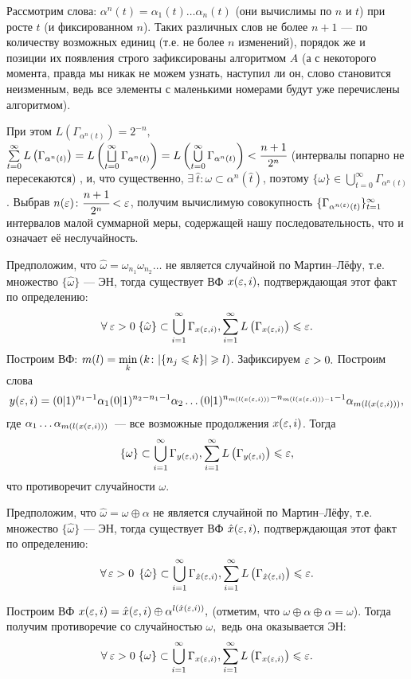 Рассмотрим слова: $\alpha^n(t)=\alpha_1(t)\ldots\alpha_n(t)$ (они вычислимы по $n$ и $t$) при росте $t$ (и фиксированном $n$). Таких различных слов не более $n+1$ --- по количеству возможных единиц (т.е. не более $n$ изменений), порядок же и позиции их появления строго зафиксированы алгоритмом $A$ (а с некоторого момента, правда мы никак не можем узнать, наступил ли он, слово становится неизменным, ведь все элементы с маленькими номерами будут уже перечислены алгоритмом). 

При этом
$L(\Gamma_{\alpha^n(t)})=2^{-n},$ 
$ \sum\limits_{t=0}^\infty L\left(\Gamma_{\alpha^n(t)}\right) =
L\left(\bigsqcup\limits_{t=0}^\infty\Gamma_{\alpha^n(t)}\right) = 
L\left(\bigcup\limits_{t=0}^\infty\Gamma_{\alpha^n(t)}\right) <
\cfrac{n+1}{2^n}$ (интервалы попарно не пересекаются)
, и, что существенно, $\exists \: \hat t \colon \omega\subset \alpha^n(\hat t)$, поэтому $\{\omega\} \in \bigcup\limits_{t=0}^\infty\Gamma_{\alpha^n(t)}$. Выбрав $n(\varepsilon)\colon \cfrac{n+1}{2^n} <  \varepsilon $, получим вычислимую совокупность $\{\Gamma_{\alpha^{n(\varepsilon)}(t)}\}_{t=1}^\infty$ интервалов малой суммарной меры, содержащей нашу последовательность, что и означает её неслучайность.


Предположим, что $\hat\omega=\omega_{n_1}\omega_{n_2}\ldots$  не является случайной по Мартин--Лёфу, т.е. множество $\{\hat\omega\}$ --- ЭН, тогда существует ВФ $x(\varepsilon,i),$ подтверждающая этот факт по определению: 
$$\forall\: \varepsilon > 0 \;
\{\hat\omega\}\subset \bigcup\limits_{i=1}^\infty\Gamma_{x(\varepsilon,i)}, 
\sum\limits_{i=1}^\infty L\left(\Gamma_{x(\varepsilon,i)}\right) \leqslant \varepsilon.$$
Построим ВФ: $m(l)=\min\limits_{k}\left(k\colon |\{n_j \leqslant k\}| \geqslant l\right)$. Зафиксируем $\varepsilon>0.$ Построим слова 
$$y(\varepsilon,i) = (0|1)^{n_1-1}\alpha_1(0|1)^{n_2-n_1-1}\alpha_2\ldots(0|1)^{n_{m(l(x(\varepsilon,i)))}-n_{m(l(x(\varepsilon,i)))-1}-1}\alpha_{m(l(x(\varepsilon,i)))},$$
где $\alpha_1\ldots\alpha_{m(l(x(\varepsilon,i)))}$~--- все возможные продолжения $x(\varepsilon,i)$. Тогда 
$$\{\omega\}\subset \bigcup\limits_{i=1}^{\infty}\Gamma_{y(\varepsilon,i)}, 
\sum\limits_{i=1}^\infty L\left(\Gamma_{y(\varepsilon,i)}\right) \leqslant \varepsilon,$$
что противоречит случайности $\omega$.


Предположим, что $\hat \omega = \omega\oplus \alpha$ не является случайной по Мартин--Лёфу, т.е. множество $\{\hat \omega\}$ --- ЭН, тогда существует ВФ $\hat x(\varepsilon,i),$ подтверждающая этот факт по определению: 
$$\forall\,\varepsilon > 0\:\:
\{\hat \omega\}\subset \bigcup\limits_{i=1}^\infty\Gamma_{\hat x(\varepsilon,i)}, 
\sum\limits_{i=1}^\infty L\left(\Gamma_{\hat x(\varepsilon,i)}\right) \leqslant \varepsilon.$$

Построим ВФ  $x(\varepsilon,i) = \hat x(\varepsilon,i)\oplus \alpha^{l(\hat x(\varepsilon,i))},$ (отметим, что $\omega\oplus \alpha \oplus \alpha = \omega$). Тогда получим противоречие со случайностью $\omega,$ ведь она оказывается ЭН:
$$\forall\: \varepsilon > 0 \;
\{\omega\}\subset \bigcup\limits_{i=1}^\infty\Gamma_{x(\varepsilon,i)}, 
\sum\limits_{i=1}^\infty L\left(\Gamma_{x(\varepsilon,i)}\right) \leqslant \varepsilon.$$